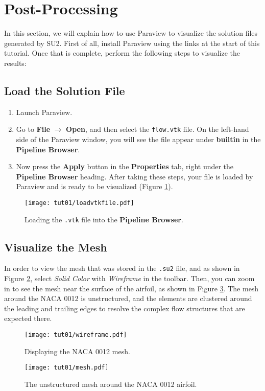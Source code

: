 \section{Post-Processing}
In this section, we will explain how to use Paraview to visualize the solution files generated by SU2. First of all, install Paraview using the links at the start of this tutorial. Once that is complete, perform the following steps to visualize the results:
\subsection{Load the Solution File}

\begin{enumerate}[label=\arabic*)]
    \item Launch Paraview.
    \item Go to \textbf{File} $\rightarrow$ \textbf{Open}, and then select the \texttt{flow.vtk} file. On the left-hand side of the Paraview window, you will see the file appear under \textbf{builtin} in the \textbf{Pipeline Browser}.
    \item Now press the \textbf{Apply} button in the \textbf{Properties} tab, right under the \textbf{Pipeline Browser} heading. After taking these steps, your file is loaded by Paraview and is ready to be visualized (Figure \ref{fig1:load}).
\end{enumerate}
\begin{figure}[ht]
    \centering
    \texttt{[image: tut01/loadvtkfile.pdf]}
    \caption{Loading the \texttt{.vtk} file into the \textbf{Pipeline Browser}.}
    \label{fig1:load}
\end{figure}
\subsection{Visualize the Mesh}
In order to view the mesh that was stored in the \texttt{.su2} file, and as shown in Figure \ref{fig1:wireframe}, select \textit{Solid Color} with \textit{Wireframe} in the toolbar. Then, you can zoom in to see the mesh near the surface of the airfoil, as shown in Figure \ref{fig1:mesh}. The mesh around the NACA 0012 is unstructured, and the elements are clustered around the leading and trailing edges to resolve the complex flow structures that are expected there.
\begin{figure}[ht]
    \centering
    \texttt{[image: tut01/wireframe.pdf]}
    \caption{Displaying the NACA 0012 mesh.}
    \label{fig1:wireframe}
\end{figure}
\begin{figure}[ht]
    \centering
    \texttt{[image: tut01/mesh.pdf]}
    \caption{The unstructured mesh around the NACA 0012 airfoil.}
    \label{fig1:mesh}
\end{figure}

